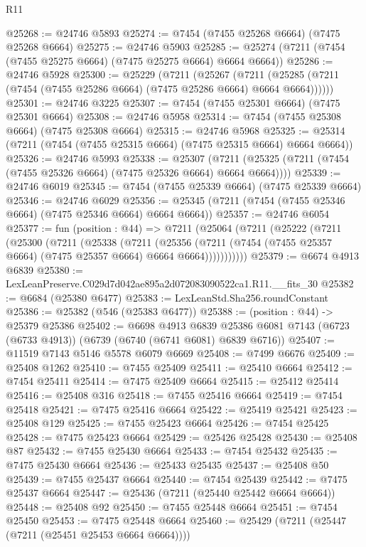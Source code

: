 \begin{lexlean}{R11}
\begin{coremodule}
@25268 := @24746 @5893
@25274 := @7454 (@7455 @25268 @6664) (@7475 @25268 @6664)
@25275 := @24746 @5903
@25285 := @25274 (@7211 (@7454 (@7455 @25275 @6664) (@7475 @25275 @6664) @6664 @6664))
@25286 := @24746 @5928
@25300 := @25229
    (@7211
      (@25267
        (@7211 (@25285 (@7211 (@7454 (@7455 @25286 @6664) (@7475 @25286 @6664) @6664 @6664))))))
@25301 := @24746 @3225
@25307 := @7454 (@7455 @25301 @6664) (@7475 @25301 @6664)
@25308 := @24746 @5958
@25314 := @7454 (@7455 @25308 @6664) (@7475 @25308 @6664)
@25315 := @24746 @5968
@25325 := @25314 (@7211 (@7454 (@7455 @25315 @6664) (@7475 @25315 @6664) @6664 @6664))
@25326 := @24746 @5993
@25338 := @25307
    (@7211 (@25325 (@7211 (@7454 (@7455 @25326 @6664) (@7475 @25326 @6664) @6664 @6664))))
@25339 := @24746 @6019
@25345 := @7454 (@7455 @25339 @6664) (@7475 @25339 @6664)
@25346 := @24746 @6029
@25356 := @25345 (@7211 (@7454 (@7455 @25346 @6664) (@7475 @25346 @6664) @6664 @6664))
@25357 := @24746 @6054
@25377 := fun (position : @44) =>
  @7211
    (@25064
      (@7211
        (@25222
          (@7211
            (@25300
              (@7211
                (@25338
                  (@7211
                    (@25356
                      (@7211 (@7454 (@7455 @25357 @6664) (@7475 @25357 @6664) @6664 @6664)))))))))))
@25379 := @6674 @4913 @6839
@25380 := LexLeanPreserve.C029d7d042ae895a2d072083090522ca1.R11.__fits_30
@25382 := @6684 (@25380 @6477)
@25383 := LexLeanStd.Sha256.roundConstant
@25386 := @25382 (@546 (@25383 @6477))
@25388 := (position : @44) -> @25379 @25386
@25402 := @6698
    @4913
    @6839
    @25386
    @6081
    @7143
    (@6723 (@6733 @4913))
    (@6739 (@6740 (@6741 @6081) @6839 @6716))
@25407 := @11519 @7143 @5146 @5578 @6079 @6669
@25408 := @7499 @6676
@25409 := @25408 @1262
@25410 := @7455 @25409
@25411 := @25410 @6664
@25412 := @7454 @25411
@25414 := @7475 @25409 @6664
@25415 := @25412 @25414
@25416 := @25408 @316
@25418 := @7455 @25416 @6664
@25419 := @7454 @25418
@25421 := @7475 @25416 @6664
@25422 := @25419 @25421
@25423 := @25408 @129
@25425 := @7455 @25423 @6664
@25426 := @7454 @25425
@25428 := @7475 @25423 @6664
@25429 := @25426 @25428
@25430 := @25408 @87
@25432 := @7455 @25430 @6664
@25433 := @7454 @25432
@25435 := @7475 @25430 @6664
@25436 := @25433 @25435
@25437 := @25408 @50
@25439 := @7455 @25437 @6664
@25440 := @7454 @25439
@25442 := @7475 @25437 @6664
@25447 := @25436 (@7211 (@25440 @25442 @6664 @6664))
@25448 := @25408 @92
@25450 := @7455 @25448 @6664
@25451 := @7454 @25450
@25453 := @7475 @25448 @6664
@25460 := @25429 (@7211 (@25447 (@7211 (@25451 @25453 @6664 @6664))))

\end{coremodule}
\end{lexlean}
